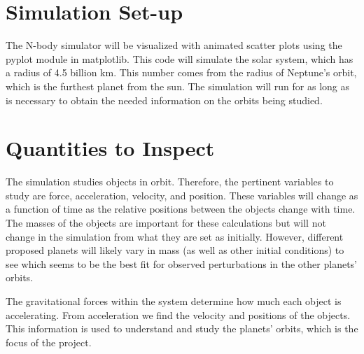 \documentclass[a4paper,12pt]{article} %
\numberwithin{equation}{section} %
\numberwithin{figure}{section} %
\begin{document}
\section{Simulation Set-up}
The N-body simulator will be visualized with animated scatter plots using the pyplot module in matplotlib. This code will simulate the solar system, which has a radius of 4.5 billion km. This number comes from the radius of Neptune’s orbit, which is the furthest planet from the sun. The simulation will run for as long as is necessary to obtain the needed information on the orbits being studied.


\section{Quantities to Inspect}
The simulation studies objects in orbit. Therefore, the pertinent variables to study are force, acceleration, velocity, and position. These variables will change as a function of time as the relative positions between the objects change with time. The masses of the objects are important for these calculations but will not change in the simulation from what they are set as initially. However, different proposed planets will likely vary in mass (as well as other initial conditions) to see which seems to be the best fit for observed perturbations in the other planets’ orbits. 
\par
The gravitational forces within the system determine how much each object is accelerating. From acceleration we find the velocity and positions of the objects. This information is used to understand and study the planets’ orbits, which is the focus of the project.


  
\end{document}
